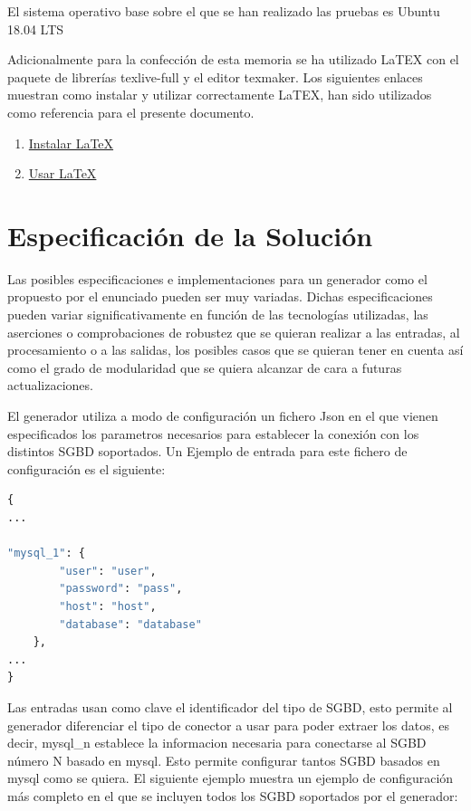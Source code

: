 \documentclass[a4paper,11pt]{book}
\begin{document}
El sistema operativo base sobre el que se han realizado las pruebas es Ubuntu 18.04 LTS

Adicionalmente para la confección de esta memoria se ha utilizado LaTEX con el paquete de librerías texlive-full y el editor texmaker. Los siguientes enlaces muestran como instalar y utilizar correctamente LaTEX, han sido utilizados como referencia para el presente documento. 

\begin{enumerate}
\item \href{http://milq.github.io/install-latex-ubuntu-debian/}{Instalar LaTeX}
\item \href{ http://minisconlatex.blogspot.com.es/}{Usar LaTeX}
\end{enumerate}
 
\section{Especificación de la Solución}

Las posibles especificaciones e implementaciones para un generador como el propuesto por el enunciado pueden ser muy variadas. Dichas especificaciones pueden variar significativamente en función de las tecnologías utilizadas, las aserciones o comprobaciones de robustez que se quieran realizar a las entradas, al procesamiento o a las salidas, los posibles casos que se quieran tener en cuenta así como el grado de modularidad que se quiera alcanzar de cara a futuras actualizaciones.

El generador utiliza a modo de configuración un fichero Json en el que vienen especificados los parametros necesarios para establecer la conexión con los distintos SGBD soportados. Un Ejemplo de entrada para este fichero de configuración es el siguiente: 

\begin{lstlisting}[language=python,caption={ Entrada Unitaria Configuración Generador }]
{
...

"mysql_1": {
		"user": "user",
		"password": "pass",
		"host": "host",
		"database": "database"
	},
...
}
\end{lstlisting}

Las entradas usan como clave el identificador del tipo de SGBD, esto permite al generador diferenciar el tipo de conector a usar para poder extraer los datos, es decir, mysql\_n establece la informacion necesaria para conectarse al SGBD número N basado en mysql. Esto permite configurar tantos SGBD basados en mysql como se quiera. El siguiente ejemplo muestra un ejemplo de configuración más completo en el que se incluyen todos los SGBD soportados por el generador: 
\end{document}
